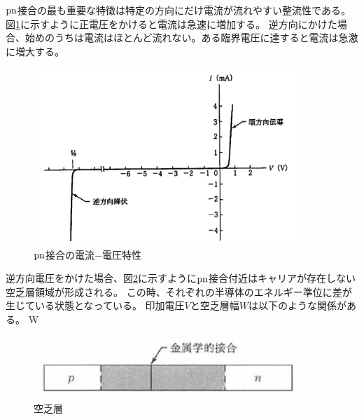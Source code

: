 $\rm{pn}$接合の最も重要な特徴は特定の方向にだけ電流が流れやすい整流性である。図\ref{pn_iv}に示すように正電圧をかけると電流は急速に増加する。
逆方向にかけた場合、始めのうちは電流はほとんど流れない。ある臨界電圧に達すると電流は急激に増大する。

\begin{figure}[bpt]\centering
\includegraphics[width=10cm]{./pn_iv.png}
\caption[$\rm{pn}$接合の電流$-$電圧特性]{$\rm{pn}$接合の電流$-$電圧特性\cite{2-1}}
\label{pn_iv}
\end{figure}

逆方向電圧をかけた場合、図\ref{depletion_field}に示すように$\rm{pn}$接合付近はキャリアが存在しない空乏層領域が形成される。
この時、それぞれの半導体のエネルギー準位に差が生じている状態となっている。
印加電圧$V$と空乏層幅$W$は以下のような関係がある。
\bbb
W \propto {}
\eee

\begin{figure}[bpt]\centering
\includegraphics[width=10cm]{./depletion_field.png}
\caption[空乏層]{空乏層\cite{2-1}}
\label{depletion_field}
\end{figure}

